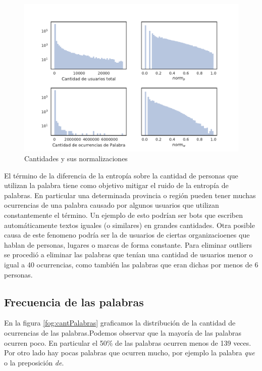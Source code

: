 \begin{figure}[!ht]
\centering
\includegraphics[width=1.0\textwidth]{./images/train/sinFiltro/cantNorms_sinFiltro.pdf}
\caption{Cantidades y sus normalizaciones} 
\label{fig:cantNorms} 
\end{figure}

El término de la diferencia de la entropía sobre la cantidad de personas que utilizan la palabra tiene como objetivo mitigar el ruido de la entropía de palabras. En particular una determinada provincia o región pueden tener muchas ocurrencias de una palabra causado por algunos usuarios que utilizan constantemente el término. Un ejemplo de esto podrían ser bots que escriben automáticamente textos iguales (o similares) en grandes cantidades. Otra posible causa de este fenomeno podría ser la de usuarios de ciertas organizacioenes que hablan de personas, lugares o marcas de forma constante. 
Para eliminar outliers se procedió a eliminar las palabras que tenían una cantidad de usuarios menor o igual a 40 ocurrencias, como también las palabras que eran dichas por menos de 6 personas. 

\subsection{Frecuencia de las palabras}
\label{sub: frecuenciaPalabras}
En la figura \ref{fog:cantPalabras} graficamos la distribución de la cantidad de ocurrencias de las palabras.Podemos observar que la mayoría de las palabras ocurren poco. En particular el 50\% de las palabras ocurren menos de 139 veces. Por otro lado hay pocas palabras que ocurren mucho, por ejemplo la palabra \textit{que} o la preposición \textit{de}.

